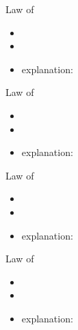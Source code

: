 \begin{frame}{\insertsubsection}
	\begin{fancycolumns}
		\begin{definition}{Law of \mysource{\lehmanslaws}}
			\begin{itemize}
				\item \deutsch{}
				\item 
				\item explanation: 
			\end{itemize}
		\end{definition}
		\begin{example}{}
		\end{example}
		\nextcolumn
		\begin{definition}{Law of \mysource{\lehmanslaws}}
			\begin{itemize}
				\item \deutsch{}
				\item 
				\item explanation: 
			\end{itemize}
		\end{definition}
		\begin{example}{}
		\end{example}
	\end{fancycolumns}
\end{frame}

\begin{frame}{\insertsubsection}
	\begin{fancycolumns}
		\begin{definition}{Law of \mysource{\lehmanslaws}}
			\begin{itemize}
				\item \deutsch{}
				\item 
				\item explanation: 
			\end{itemize}
		\end{definition}
		\begin{example}{}
		\end{example}
		\nextcolumn
		\begin{definition}{Law of \mysource{\lehmanslaws}}
			\begin{itemize}
				\item \deutsch{}
				\item 
				\item explanation: 
			\end{itemize}
		\end{definition}
		\begin{example}{}
		\end{example}
	\end{fancycolumns}
\end{frame}

